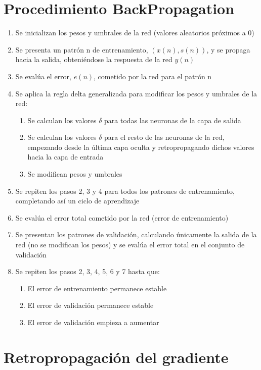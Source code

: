 \documentclass[12pt, twoside, openright]{report} %
\begin{document}
\section{Procedimiento BackPropagation}
\begin{enumerate}
	\item Se inicializan los pesos y umbrales de la red (valores aleatorios próximos a 0)
	\item Se presenta un patrón n de entrenamiento, $(x(n),s(n))$, y se propaga hacia la salida, obteniéndose la respuesta de la red $y(n)$
	\item Se evalúa el error, $e(n)$, cometido por la red para el patrón n
	\item Se aplica la regla delta generalizada para modificar los pesos y umbrales de la red:
	\begin{enumerate}
		\item Se calculan los valores $\delta$ para todas las neuronas de la capa de salida
		\item Se calculan los valores $\delta$ para el resto de las neuronas de la red, empezando desde la última capa oculta y retropropagando dichos valores hacia la capa de entrada
		\item Se modifican pesos y umbrales
	\end{enumerate}
	\item Se repiten los pasos 2, 3 y 4 para todos los patrones de entrenamiento, completando así un ciclo de aprendizaje
	\item Se evalúa el error total cometido por la red (error de entrenamiento)
	\item Se presentan los patrones de validación, calculando únicamente la salida de la red (no se modifican los pesos) y se evalúa el error total en el conjunto de validación
	\item Se repiten los pasos 2, 3, 4, 5, 6 y 7 hasta que:
	\begin{enumerate}
		\item El error de entrenamiento permanece estable
		\item El error de validación permanece estable
		\item El error de validación empieza a aumentar
	\end{enumerate}
\end{enumerate}

\section{Retropropagación del gradiente}
\end{document}
